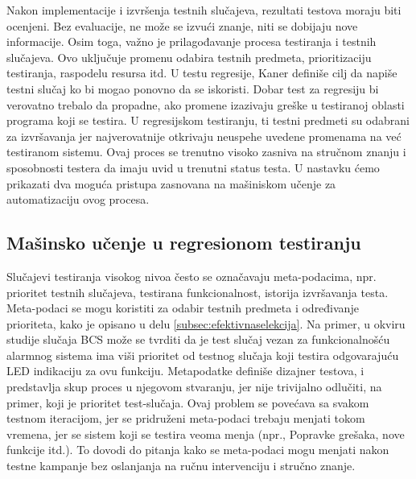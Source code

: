 \documentclass[a4paper]{article}
\begin{document}
Nakon implementacije i izvršenja testnih slučajeva, rezultati testova moraju biti ocenjeni. Bez evaluacije, ne može se izvući znanje, niti se dobijaju nove informacije. Osim toga, važno je prilagođavanje procesa testiranja i testnih slučajeva. Ovo uključuje promenu odabira testnih predmeta, prioritizaciju testiranja, raspodelu resursa itd. U testu regresije, Kaner \cite{ref22} definiše cilj da napiše testni slučaj ko bi mogao ponovno da se iskoristi. Dobar test za regresiju bi verovatno trebalo da propadne, ako promene izazivaju greške u testiranoj oblasti programa koji se testira. U regresijskom testiranju, ti testni predmeti su odabrani za izvršavanja jer najverovatnije otkrivaju neuspehe uvedene promenama na već testiranom sistemu. Ovaj proces se trenutno visoko zasniva na stručnom znanju i sposobnosti testera da imaju uvid u trenutni status testa. U nastavku ćemo prikazati dva moguća pristupa zasnovana na mašiniskom učenje za automatizaciju ovog procesa.
\bigbreak


\subsection{Mašinsko učenje u regresionom testiranju}
\label{subsec:masinskoucenje}

Slučajevi testiranja visokog nivoa često se označavaju meta-podacima, npr. prioritet testnih slučajeva, testirana funkcionalnost, istorija izvršavanja testa. Meta-podaci se mogu koristiti za odabir testnih predmeta i određivanje prioriteta, kako je opisano u delu \ref{subsec:efektivnaselekcija}. Na primer, u okviru studije slučaja BCS može se tvrditi da je test slučaj vezan za funkcionalnošću alarmnog sistema ima viši prioritet od testnog slučaja koji testira odgovarajuću LED indikaciju za ovu funkciju. Metapodatke definiše dizajner testova, i predstavlja skup proces u njegovom stvaranju, jer nije trivijalno odlučiti, na primer, koji je prioritet test-slučaja. Ovaj problem se povećava sa svakom testnom iteracijom, jer se pridruženi meta-podaci trebaju menjati tokom vremena, jer se sistem koji se testira veoma menja (npr., Popravke grešaka, nove funkcije itd.). To dovodi do pitanja kako se meta-podaci mogu menjati nakon testne kampanje bez oslanjanja na ručnu intervenciju i stručno znanje.
\bigbreak
\end{document}
